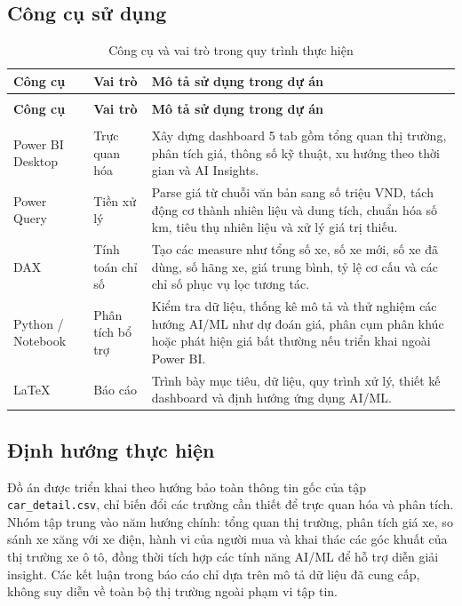 \subsection{Công cụ sử dụng}
\vspace{-1.5em}
\begin{xltabular}{\textwidth}{>{\raggedright\arraybackslash}p{3.1cm} >{\raggedright\arraybackslash}p{2.8cm} X}
\caption{Công cụ và vai trò trong quy trình thực hiện} \\
\textbf{Công cụ} & \textbf{Vai trò} & \textbf{Mô tả sử dụng trong dự án} \\ \hline
\endfirsthead
{} \\
\textbf{Công cụ} & \textbf{Vai trò} & \textbf{Mô tả sử dụng trong dự án} \\ \hline
\endhead
{} \\
\endfoot
\endlastfoot
Power BI Desktop & Trực quan hóa & Xây dựng dashboard 5 tab gồm tổng quan thị trường, phân tích giá, thông số kỹ thuật, xu hướng theo thời gian và AI Insights. \\
Power Query & Tiền xử lý & Parse giá từ chuỗi văn bản sang số triệu VND, tách động cơ thành nhiên liệu và dung tích, chuẩn hóa số km, tiêu thụ nhiên liệu và xử lý giá trị thiếu. \\
DAX & Tính toán chỉ số & Tạo các measure như tổng số xe, số xe mới, số xe đã dùng, số hãng xe, giá trung bình, tỷ lệ cơ cấu và các chỉ số phục vụ lọc tương tác. \\
Python / Notebook & Phân tích bổ trợ & Kiểm tra dữ liệu, thống kê mô tả và thử nghiệm các hướng AI/ML như dự đoán giá, phân cụm phân khúc hoặc phát hiện giá bất thường nếu triển khai ngoài Power BI. \\
\LaTeX & Báo cáo & Trình bày mục tiêu, dữ liệu, quy trình xử lý, thiết kế dashboard và định hướng ứng dụng AI/ML. \\
\end{xltabular}

\subsection{Định hướng thực hiện}

Đồ án được triển khai theo hướng bảo toàn thông tin gốc của tập \texttt{car\_detail.csv}, chỉ biến đổi các trường cần thiết để trực quan hóa và phân tích. Nhóm tập trung vào năm hướng chính: tổng quan thị trường, phân tích giá xe, so sánh xe xăng với xe điện, hành vi của người mua và khai thác các góc khuất của thị trường xe ô tô, đồng thời tích hợp các tính năng AI/ML để hỗ trợ diễn giải insight. Các kết luận trong báo cáo chỉ dựa trên mô tả dữ liệu đã cung cấp, không suy diễn về toàn bộ thị trường ngoài phạm vi tập tin.

\clearpage